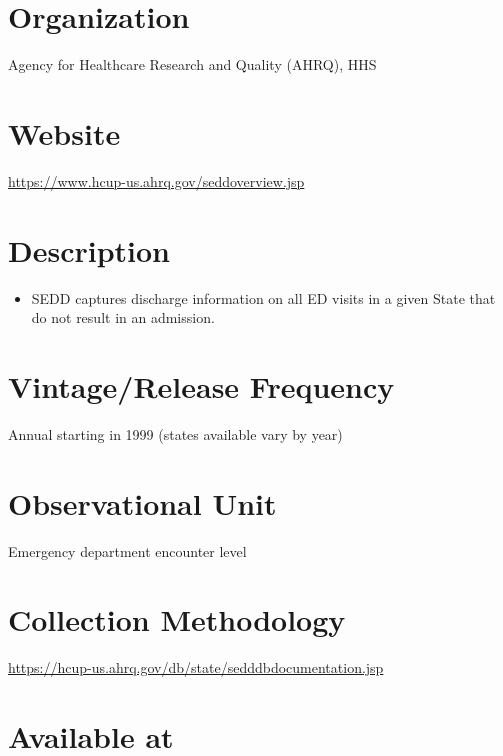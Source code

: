 \documentclass[
]{book}
\providecommand{\tightlist}{%
  \setlength{\itemsep}{0pt}\setlength{\parskip}{0pt}}
\begin{document}
\hypertarget{organization-83}{%
\section{Organization}\label{organization-83}}

Agency for Healthcare Research and Quality (AHRQ), HHS

\hypertarget{website-83}{%
\section{Website}\label{website-83}}

\url{https://www.hcup-us.ahrq.gov/seddoverview.jsp}

\hypertarget{description-83}{%
\section{Description}\label{description-83}}

\begin{itemize}
\tightlist
\item
  SEDD captures discharge information on all ED visits in a given State that do not result in an admission.
\end{itemize}

\hypertarget{vintagerelease-frequency-83}{%
\section{Vintage/Release Frequency}\label{vintagerelease-frequency-83}}

Annual starting in 1999 (states available vary by year)

\hypertarget{observational-unit-83}{%
\section{Observational Unit}\label{observational-unit-83}}

Emergency department encounter level

\hypertarget{collection-methodology-83}{%
\section{Collection Methodology}\label{collection-methodology-83}}

\url{https://hcup-us.ahrq.gov/db/state/sedddbdocumentation.jsp}

\hypertarget{available-at-83}{%
\section{Available at}\label{available-at-83}}
\end{document}
